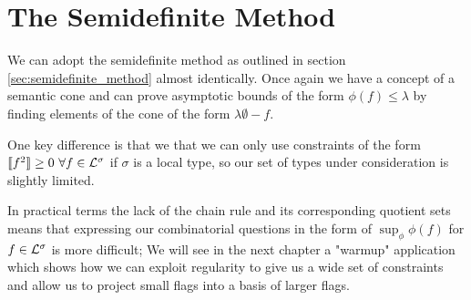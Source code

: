 \section{The Semidefinite Method}

We can adopt the semidefinite method as outlined in section \ref{sec:semidefinite_method}
almost identically. Once again we have a concept of a semantic cone and can prove
asymptotic bounds of the form $\phi(f) \leq \lambda$ by finding elements of the cone of
the form $\lambda\emptyset - f$.

One key difference is that we that we can only use constraints of the form
$\llbracket f^2 \rrbracket \geq 0\ \forall f \in \Lcl^\sigma$ if $\sigma$ is a
local type, so our set of types under consideration is slightly limited.

In practical terms the lack of the chain rule and its corresponding quotient sets means that
expressing our combinatorial questions in the form of $\sup_\phi \phi(f)$ for $f\in\mathcal{L}^\sigma$ is
more difficult; We will see in the next chapter a "warmup" application which shows how we can
exploit regularity to give us a wide set of constraints and allow us to project small
flags into a basis of larger flags.
